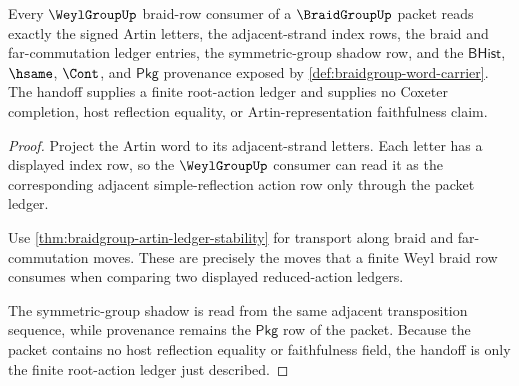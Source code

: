 \begin{theorem}
\label{thm:braidgroup-weyl-root-action-handoff}
Every $\WeylGroupUp$ braid-row consumer of a $\BraidGroupUp$ packet reads exactly the signed Artin letters, the adjacent-strand index rows, the braid and far-commutation ledger entries, the symmetric-group shadow row, and the $\mathsf{BHist}$, $\hsame$, $\Cont$, and $\mathsf{Pkg}$ provenance exposed by \autoref{def:braidgroup-word-carrier}. The handoff supplies a finite root-action ledger and supplies no Coxeter completion, host reflection equality, or Artin-representation faithfulness claim.
\end{theorem}
\begin{proof}
Project the Artin word to its adjacent-strand letters. Each letter has a displayed index row, so the $\WeylGroupUp$ consumer can read it as the corresponding adjacent simple-reflection action row only through the packet ledger.

Use \autoref{thm:braidgroup-artin-ledger-stability} for transport along braid and far-commutation moves. These are precisely the moves that a finite Weyl braid row consumes when comparing two displayed reduced-action ledgers.

The symmetric-group shadow is read from the same adjacent transposition sequence, while provenance remains the $\mathsf{Pkg}$ row of the packet. Because the packet contains no host reflection equality or faithfulness field, the handoff is only the finite root-action ledger just described.
\end{proof}

